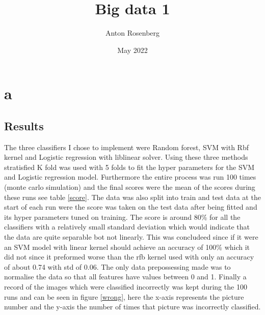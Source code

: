 \documentclass{article}
\title{Big data 1}
\author{Anton Rosenberg}
\date{May 2022}
\begin{document}
\maketitle
\newpage
\section{a}
\subsection{Results}
The three classifiers I chose to implement were Random forest, SVM with Rbf kernel and Logistic regression with liblinear solver. Using these three methods stratisfied K fold was used with 5 folds to fit the hyper parameters for the SVM and Logistic regression model. Furthermore the entire process was run 100 times (monte carlo simulation) and the final scores were the mean of the scores during these runs see table \ref{score}. The data was also split into train and test data at the start of each run were the score was taken on the test data after being fitted and its hyper parameters tuned on training. The score is around 80\% for all the classifiers with a relatively small standard deviation which would indicate that the data are quite separable bot not linearly. This was concludeed since if it were an SVM model with linear kernel should achieve an accuracy of 100\% which it did not since it preformed worse than the rfb kernel used with only an accuracy of about 0.74 with std of 0.06. The only data prepossessing made was to normalise the data so that all features have values between 0 and 1. Finally a record of the images which were classified incorrectly was kept during the 100 runs and can be seen in figure \ref{wrong}, here the x-axis represents the picture number and the y-axis the number of times that picture was incorrectly classified. 
\end{document}
